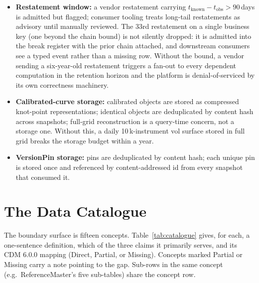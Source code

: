 \documentclass[11pt,a4paper]{article}
\begin{document}
\begin{footnotesize}
\begin{itemize}
\item \textbf{Restatement window:} a vendor restatement carrying $t_{\text{known}} - t_{\text{obs}} > 90$\,days is admitted but flagged; consumer tooling treats long-tail restatements as advisory until manually reviewed. The 33rd restatement on a single business key (one beyond the chain bound) is not silently dropped: it is admitted into the break register with the prior chain attached, and downstream consumers see a typed event rather than a missing row. Without the bound, a vendor sending a six-year-old restatement triggers a fan-out to every dependent computation in the retention horizon and the platform is denial-of-serviced by its own correctness machinery.
\item \textbf{Calibrated-curve storage:} calibrated objects are stored as compressed knot-point representations; identical objects are deduplicated by content hash across snapshots; full-grid reconstruction is a query-time concern, not a storage one. Without this, a daily 10\,k-instrument vol surface stored in full grid breaks the storage budget within a year.
\item \textbf{VersionPin storage:} pins are deduplicated by content hash; each unique pin is stored once and referenced by content-addressed id from every snapshot that consumed it.
\end{itemize}
\end{footnotesize}

\section{The Data Catalogue}\label{sec:catalogue}

The boundary surface is fifteen concepts. Table~\ref{tab:catalogue} gives, for each, a one-sentence definition, which of the three claims it primarily serves, and its CDM 6.0.0 mapping (Direct, Partial, or Missing). Concepts marked Partial or Missing carry a note pointing to the gap. Sub-rows in the same concept (e.g.\ ReferenceMaster's five sub-tables) share the concept row.
\end{document}
